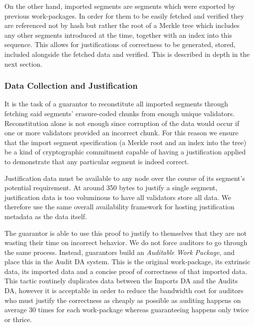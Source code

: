 On the other hand, imported segments are segments which were exported by previous work-packages. In order for them to be easily fetched and verified they are referenced not by hash but rather the root of a Merkle tree which includes any other segments introduced at the time, together with an index into this sequence. This allows for justifications of correctness to be generated, stored, included alongside the fetched data and verified. This is described in depth in the next section.

\subsubsection{Data Collection and Justification}


It is the task of a guarantor to reconstitute all imported segments through fetching said segments' erasure-coded chunks from enough unique validators. Reconstitution alone is not enough since corruption of the data would occur if one or more validators provided an incorrect chunk. For this reason we ensure that the import segment specification (a Merkle root and an index into the tree) be a kind of cryptographic commitment capable of having a justification applied to demonstrate that any particular segment is indeed correct.

Justification data must be available to any node over the course of its segment's potential requirement. At around 350 bytes to justify a single segment, justification data is too voluminous to have all validators store all data. We therefore use the same overall availability framework for hosting justification metadata as the data itself.

The guarantor is able to use this proof to justify to themselves that they are not wasting their time on incorrect behavior. We do not force auditors to go through the same process. Instead, guarantors build an \emph{Auditable Work Package}, and place this in the Audit DA system. This is the original work-package, its extrinsic data, its imported data and a concise proof of correctness of that imported data. This tactic routinely duplicates data between the Imports DA and the Audits DA, however it is acceptable in order to reduce the bandwidth cost for auditors who must justify the correctness as cheaply as possible as auditing happens on average 30 times for each work-package whereas guaranteeing happens only twice or thrice.

